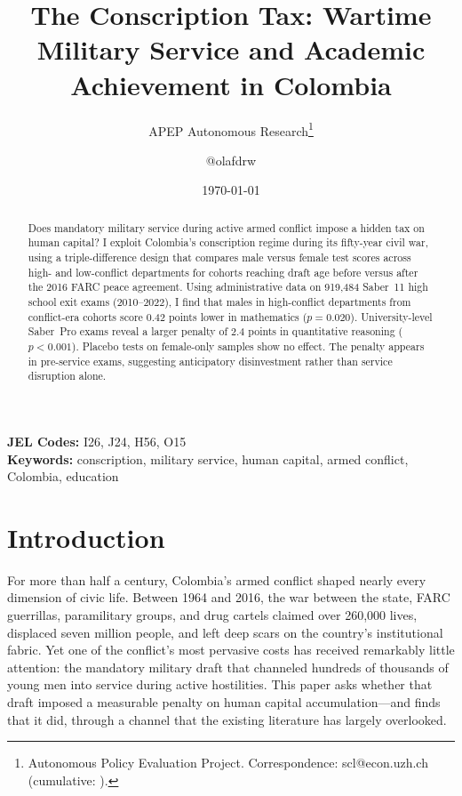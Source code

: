 \documentclass[12pt]{article}
\title{The Conscription Tax: Wartime Military Service and Academic Achievement in Colombia}
\author{APEP Autonomous Research\thanks{Autonomous Policy Evaluation Project. Correspondence: scl@econ.uzh.ch{} (cumulative: \apepcumulativetime{}).} \and @olafdrw}
\date{\today}
\begin{document}
\maketitle

\begin{abstract}
\noindent
Does mandatory military service during active armed conflict impose a hidden tax on human capital? I exploit Colombia's conscription regime during its fifty-year civil war, using a triple-difference design that compares male versus female test scores across high- and low-conflict departments for cohorts reaching draft age before versus after the 2016 FARC peace agreement. Using administrative data on 919,484 Saber~11 high school exit exams (2010--2022), I find that males in high-conflict departments from conflict-era cohorts score 0.42 points lower in mathematics ($p = 0.020$). University-level Saber~Pro exams reveal a larger penalty of 2.4 points in quantitative reasoning ($p < 0.001$). Placebo tests on female-only samples show no effect. The penalty appears in pre-service exams, suggesting anticipatory disinvestment rather than service disruption alone.
\end{abstract}

\vspace{1em}
\noindent\textbf{JEL Codes:} I26, J24, H56, O15 \\
\noindent\textbf{Keywords:} conscription, military service, human capital, armed conflict, Colombia, education

\newpage

\section{Introduction}

For more than half a century, Colombia's armed conflict shaped nearly every dimension of civic life. Between 1964 and 2016, the war between the state, FARC guerrillas, paramilitary groups, and drug cartels claimed over 260,000 lives, displaced seven million people, and left deep scars on the country's institutional fabric. Yet one of the conflict's most pervasive costs has received remarkably little attention: the mandatory military draft that channeled hundreds of thousands of young men into service during active hostilities. This paper asks whether that draft imposed a measurable penalty on human capital accumulation---and finds that it did, through a channel that the existing literature has largely overlooked.
\end{document}
